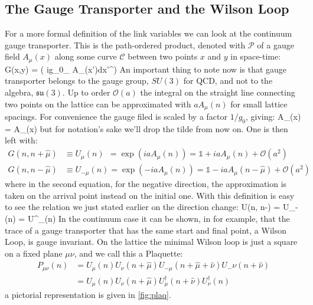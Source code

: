 \subsection{The Gauge Transporter and the Wilson Loop}
For a more formal definition of the link variables we can look at the continuum gauge transporter. This is the path-ordered product, denoted with $\mathcal{P}$ of a gauge field $A_\mu(x)$ along some curve $\mathcal{C}$ between two points $x$ and $y$ in space-time:
\beq
    G(x,y) =  \exp\left( ig_0\int_ A_\mu(x')dx'^\mu  \right)
\eeq
An important thing to note now is that gauge transporter belongs to the gauge group, $SU(3)$ for QCD, and not to the algebra, $\mathfrak{su}(3)$. 
Up to order $\mathcal{O}(a)$ the integral on the straight line connecting two points on the lattice can be approximated with $aA_\mu(n)$ for small lattice spacings. For convenience the gauge filed is scaled by a factor $1/g_0$, giving: 
\beq
\tilde A_\mu(x) =  A_\mu(x)
\label{eq:fieldscale}
\eeq
but for notation's sake we'll drop the tilde from now on. One is then left with:
\begin{align}
    G(n,n+\hat\mu) &\equiv U_\mu(n) ~~= \exp(iaA_\mu(n)) = \mathds{1} + iaA_\mu(n) + \mathcal{O}(a^2) \label{eq:transporter}\\\nonumber
    G(n,n-\hat\mu) &\equiv U_{-\mu}(n) = \exp(-iaA_\mu(n)) = \mathds{1} - iaA_\mu(n-\hat\mu) + \mathcal{O}(a^2)
\end{align}
where in the second equation, for the negative direction, the approximation is taken on the arrival point instead on the initial one. With this definition is easy to see the relation we just stated earlier on the direction change:
\beq
    U(n, n-\hat\mu) = U_{-\mu}(n) = U^\dagger_\mu(n)
\eeq
In the continuum case it can be shown, in \cite{peskin} for example, that the trace of a gauge transporter that has the same start and final point, a Wilson Loop, is gauge invariant. On the lattice the minimal Wilson loop is just a square on a fixed plane $\mu\nu$, and we call this a Plaquette:
\begin{align}
    \label{plaquette}
P_{\mu\nu}(n) &= U_\mu(n) U_\nu(n+\hat\mu) U_{-\mu}(n+\hat\mu+\hat\nu) U_-{\nu}(n+\hat\nu)  \\\nonumber
              &= U_\mu(n) U_\nu(n+\hat\mu) U^\dagger_\mu(n+\hat\nu) U^\dagger_\nu(n)
\end{align}
a pictorial representation is given in \cref{fig:plaq}.
